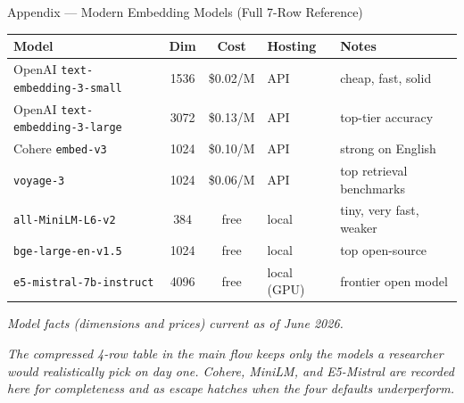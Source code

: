 \appendix

\begin{frame}{Appendix --- Modern Embedding Models (Full 7-Row Reference)}
\begin{center}
\renewcommand{\arraystretch}{1.25}
\small
\begin{tabular}{|l|c|c|l|l|}
\hline
\textbf{Model} & \textbf{Dim} & \textbf{Cost} & \textbf{Hosting} & \textbf{Notes} \\
\hline
OpenAI \texttt{text-embedding-3-small} & 1536 & \$0.02/M & API & cheap, fast, solid \\
\hline
OpenAI \texttt{text-embedding-3-large} & 3072 & \$0.13/M & API & top-tier accuracy \\
\hline
Cohere \texttt{embed-v3} & 1024 & \$0.10/M & API & strong on English \\
\hline
\texttt{voyage-3} & 1024 & \$0.06/M & API & top retrieval benchmarks \\
\hline
\texttt{all-MiniLM-L6-v2} & 384 & free & local & tiny, very fast, weaker \\
\hline
\texttt{bge-large-en-v1.5} & 1024 & free & local & top open-source \\
\hline
\texttt{e5-mistral-7b-instruct} & 4096 & free & local (GPU) & frontier open model \\
\hline
\end{tabular}
\end{center}

\smallskip
{\footnotesize\centering\textit{Model facts (dimensions and prices) current as of June 2026.}\par}

\medskip
\textit{The compressed 4-row table in the main flow keeps only the models a researcher would realistically pick on day one. Cohere, MiniLM, and E5-Mistral are recorded here for completeness and as escape hatches when the four defaults underperform.}
\end{frame}



